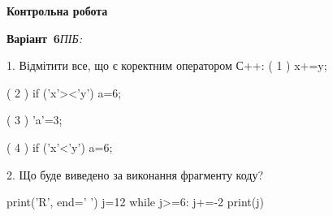 \documentclass[11pt]{article}
\begin{document}
{\large\textbf{Контрольна робота}}

\textbf{Варіант \No\,6}\hfill \textit{ПІБ:}\,\underline{\hspace{60mm}}
\vspace{4mm}

1. %
Відмітити все, що є коректним оператором С++:
( 1 ) x+=y;

( 2 ) if ('x'><'y') a=6;

( 3 ) 'a'=3;

( 4 ) if ('x'<'y') a=6;


2. Що буде виведено за виконання фрагменту коду?

print('R', end=' ')
j=12
while j>=6:
    j+=-2
print(j)



\newpage
\end{document}
